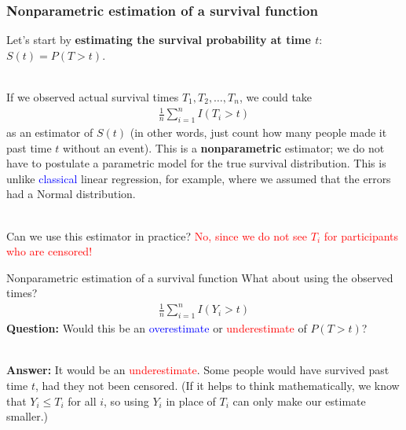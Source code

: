 \documentclass[10pt,t]{beamer}
\begin{document}
\begin{frame}
\frametitle{Nonparametric estimation of a survival function}
Let's start by \textbf{estimating the survival probability at time $t$}: $S(t) = P(T > t)$.
\\ ~\ 

If we observed actual survival times $T_1, T_2, \dots, T_n$, we could take
\begin{align*}
\frac{1}{n}\sum_{i=1}^n I(T_i > t)
\end{align*}
as an estimator of $S(t)$ (in other words, just count how many people made it past time $t$ without an event). This is a \textbf{nonparametric} estimator; we do not have to postulate a parametric model for the true survival distribution. This is unlike \textcolor{blue}{classical} linear regression, for example, where we assumed that the errors had a Normal distribution. 
\\ ~\ 

Can we use this estimator in practice? \pause \textcolor{red}{No, since we do not see $T_i$ for participants who are censored!}
\end{frame}

\begin{frame}{Nonparametric estimation of a survival function}
	What about using the observed times?
	\begin{align*}
		\frac{1}{n}\sum_{i=1}^{n}I(Y_i > t)
	\end{align*}
	\textbf{Question:} Would this be an \textcolor{blue}{overestimate} or \textcolor{red}{underestimate} of $P(T > t)$? \pause 
	\\ ~\ 
	
	\textbf{Answer:} It would be an \textcolor{red}{underestimate}. Some people would have survived past time $t$, had they not been censored. (If it helps to think mathematically, we know that $Y_i \leq T_i$ for all $i$, so using $Y_i$ in place of $T_i$ can only make our estimate smaller.)
\end{frame}
\end{document}
